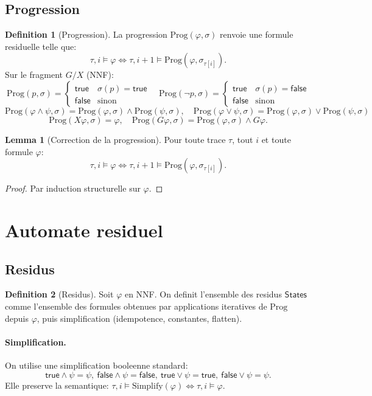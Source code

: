 \documentclass[11pt]{article}
\newcommand{\eval}{\models}
\newcommand{\Prog}{\mathrm{Prog}}
\newcommand{\states}{\mathsf{States}}
\newcommand{\True}{\mathsf{true}}
\newcommand{\False}{\mathsf{false}}
\theoremstyle{definition}
\newtheorem{definition}{Definition}
\newtheorem{lemma}{Lemma}
\begin{document}
\subsection{Progression}

\begin{definition}[Progression]
La progression $\Prog(\varphi,\sigma)$ renvoie une formule residuelle telle que:
\[
\tau,i \eval \varphi \iff \tau,i+1 \eval \Prog(\varphi,\sigma_{\tau[i]}).
\]
Sur le fragment $G/X$ (NNF):
\[
\Prog(p,\sigma)=\begin{cases}\True & \sigma(p)=\True\\ \False & \text{sinon}\end{cases}
\quad
\Prog(\neg p,\sigma)=\begin{cases}\True & \sigma(p)=\False\\ \False & \text{sinon}\end{cases}
\]
\[
\Prog(\varphi\wedge\psi,\sigma)=\Prog(\varphi,\sigma)\wedge\Prog(\psi,\sigma),\quad
\Prog(\varphi\vee\psi,\sigma)=\Prog(\varphi,\sigma)\vee\Prog(\psi,\sigma)
\]
\[
\Prog(X\varphi,\sigma)=\varphi,\quad
\Prog(G\varphi,\sigma)=\Prog(\varphi,\sigma)\wedge G\varphi.
\]
\end{definition}

\begin{lemma}[Correction de la progression]
Pour toute trace $\tau$, tout $i$ et toute formule $\varphi$:
\[
\tau,i \eval \varphi \iff \tau,i+1 \eval \Prog(\varphi,\sigma_{\tau[i]}).
\]
\end{lemma}
\begin{proof}
Par induction structurelle sur $\varphi$.
\end{proof}

\section{Automate residuel}

\subsection{Residus}

\begin{definition}[Residus]
Soit $\varphi$ en NNF. On definit l'ensemble des residus $\states$ comme
l'ensemble des formules obtenues par applications iteratives de $\Prog$
depuis $\varphi$, puis simplification (idempotence, constantes, flatten).
\end{definition}

\paragraph{Simplification.}
On utilise une simplification booleenne standard:
\[
\True \wedge \psi = \psi,\ \False \wedge \psi = \False,\ 
\True \vee \psi = \True,\ \False \vee \psi = \psi.
\]
Elle preserve la semantique: $\tau,i \eval \mathrm{Simplify}(\varphi) \iff \tau,i \eval \varphi$.
\end{document}
